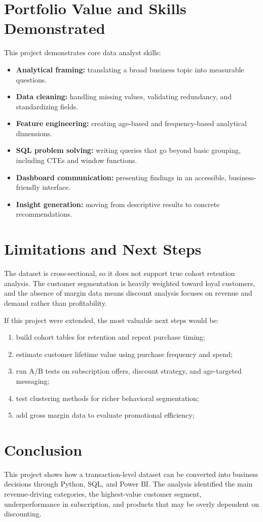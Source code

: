 \documentclass[12pt,a4paper]{article}
\begin{document}
\section{Portfolio Value and Skills Demonstrated}
This project demonstrates core data analyst skills:
\begin{itemize}
  \item \textbf{Analytical framing:} translating a broad business topic into measurable questions.
  \item \textbf{Data cleaning:} handling missing values, validating redundancy, and standardizing fields.
  \item \textbf{Feature engineering:} creating age-based and frequency-based analytical dimensions.
  \item \textbf{SQL problem solving:} writing queries that go beyond basic grouping, including CTEs and window functions.
  \item \textbf{Dashboard communication:} presenting findings in an accessible, business-friendly interface.
  \item \textbf{Insight generation:} moving from descriptive results to concrete recommendations.
\end{itemize}

\section{Limitations and Next Steps}
The dataset is cross-sectional, so it does not support true cohort retention analysis. The customer segmentation is heavily weighted toward loyal customers, and the absence of margin data means discount analysis focuses on revenue and demand rather than profitability.

If this project were extended, the most valuable next steps would be:
\begin{enumerate}
  \item build cohort tables for retention and repeat purchase timing;
  \item estimate customer lifetime value using purchase frequency and spend;
  \item run A/B tests on subscription offers, discount strategy, and age-targeted messaging;
  \item test clustering methods for richer behavioral segmentation;
  \item add gross margin data to evaluate promotional efficiency;
\end{enumerate}

\section{Conclusion}
This project shows how a transaction-level dataset can be converted into business decisions through Python, SQL, and Power BI. The analysis identified the main revenue-driving categories, the highest-value customer segment, underperformance in subscription, and products that may be overly dependent on discounting.
\end{document}
